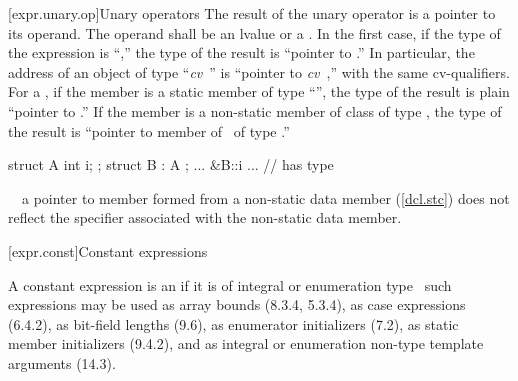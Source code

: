 \documentclass[american]{book}
\begin{document}
[expr.unary.op]{Unary operators}
\setcounter{Paras}{1}
\pnum
{}%
%
The result of the unary
\tcode{\&}
operator is a pointer to its operand.
The operand shall be an lvalue or a
.
In the first case, if the type of the expression is ``,''
the type of the result is ``pointer to
.''
In particular, the address of an object of type ``\textit{cv}\ ''
is ``pointer to \textit{cv}\ ,'' with the same cv-qualifiers.
%
For a
,
if the member is a static member of type ``'',
the type of the result is plain ``pointer to
.''
If the member is a non-static member of class
of type
,
the type of the result is
``pointer to member of \ of type
.''
\enterexample\ 

\begin{codeblock}
struct A { int i; };
struct B : A { };
... &B::i ...                 // has type 
\end{codeblock}
\exitexample\ 
\enternote\ 
a pointer to member formed from a
non-static data member (\ref{dcl.stc}) does not reflect the
\tcode{mutable}
specifier associated with the non-static data member.
\exitnote\ 

\setcounter{section}{18}
[expr.const]{Constant expressions}

\setcounter{Paras}{2}
\pnum
A constant expression is an  if
it is of integral or enumeration type  \enternote\ such
expressions may be used as array bounds (8.3.4, 5.3.4), as case
expressions (6.4.2), as bit-field lengths (9.6), as enumerator
initializers (7.2), as static member initializers (9.4.2), and as
integral or enumeration non-type template arguments (14.3). \exitnote\
\end{document}
